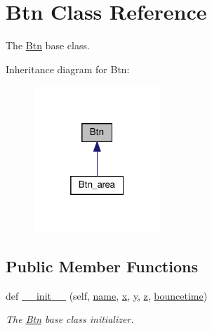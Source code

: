 \hypertarget{classRET__config_1_1Btn}{}\section{Btn Class Reference}
\label{classRET__config_1_1Btn}


The \hyperlink{classRET__config_1_1Btn}{Btn} base class.  




Inheritance diagram for Btn\+:
\nopagebreak
\begin{figure}[H]
\begin{center}
\leavevmode
\includegraphics[width=136pt]{classRET__config_1_1Btn__inherit__graph}
\end{center}
\end{figure}
\subsection*{Public Member Functions}
\begin{DoxyCompactItemize}
\item 
def \hyperlink{classRET__config_1_1Btn_aa725bfbd448cdd640b165bb91322b69b}{\+\_\+\+\_\+init\+\_\+\+\_\+} (self, \hyperlink{classRET__config_1_1Btn_ab74e6bf80237ddc4109968cedc58c151}{name}, \hyperlink{classRET__config_1_1Btn_a9336ebf25087d91c818ee6e9ec29f8c1}{x}, \hyperlink{classRET__config_1_1Btn_a2fb1c5cf58867b5bbc9a1b145a86f3a0}{y}, \hyperlink{classRET__config_1_1Btn_a25ed1bcb423b0b7200f485fc5ff71c8e}{z}, \hyperlink{classRET__config_1_1Btn_a4b8980abcbbe29171f010fbaf958e5aa}{bouncetime})
\begin{DoxyCompactList}\small\item\em The \hyperlink{classRET__config_1_1Btn}{Btn} base class initializer. \end{DoxyCompactList}\end{DoxyCompactItemize}
